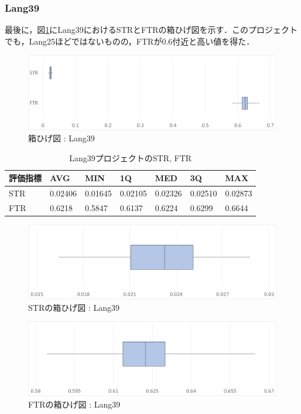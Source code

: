\documentclass[uplatex,dvipdfmx,a4paper]{jsarticle}
\begin{document}
\subsubsection{Lang39}
最後に，図\ref{fig:Lang39_boxplot}にLang39におけるSTRとFTRの箱ひげ図を示す．このプロジェクトでも，Lang25ほどではないものの，FTRが0.6付近と高い値を得た．
\begin{figure}[t]
  \centering
  \includegraphics[width=\linewidth]{fig/Lang39_boxplot.png}
  \caption{箱ひげ図 : Lang39}
  \label{fig:Lang39_boxplot}
\end{figure}
\begin{table}[b]
  \centering
  \caption{Lang39プロジェクトのSTR, FTR}
  \label{tab:Lang39}
  \begin{tabular}{l|llllll} \hline\hline
    評価指標 & AVG         & MIN & 1Q & MED & 3Q & MAX   \\\hline
    STR & 0.02406 & 0.01645 & 0.02105 & 0.02326 & 0.02510 & 0.02873  \\
    FTR & 0.6218 & 0.5847 & 0.6137 & 0.6224 & 0.6299 & 0.6644 \\\hline\hline
  \end{tabular}
\end{table}
\begin{figure}[t]
  \centering
  \includegraphics[width=\linewidth]{fig/Lang39_boxplot_STR.png}
  \caption{STRの箱ひげ図 : Lang39}
  \label{fig:Lang39_boxplot_STR}
\end{figure}
\begin{figure}[t]
  \centering
  \includegraphics[width=\linewidth]{fig/Lang39_boxplot_FTR.png}
  \caption{FTRの箱ひげ図 : Lang39}
  \label{fig:Lang39_boxplot_FTR}
\end{figure}
\clearpage
\end{document}
